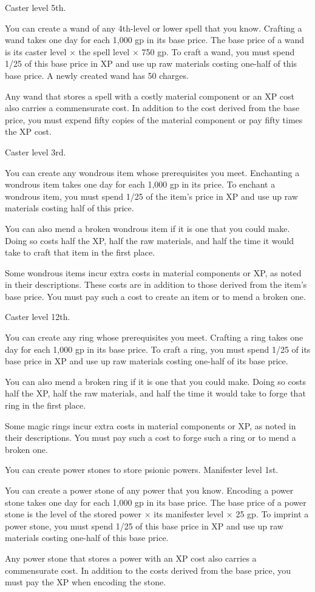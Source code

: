 {Caster level 5th.}
{You can create a wand of any 4th-level or lower spell that you know. Crafting a wand takes one day for each 1,000 gp in its base price. The base price of a wand is its caster level $\times$ the spell level $\times$ 750 gp. To craft a wand, you must spend 1/25 of this base price in XP and use up raw materials costing one-half of this base price. A newly created wand has 50 charges.

Any wand that stores a spell with a costly material component or an XP cost also carries a commensurate cost. In addition to the cost derived from the base price, you must expend fifty copies of the material component or pay fifty times the XP cost.}

{Caster level 3rd.}
{You can create any wondrous item whose prerequisites you meet. Enchanting a wondrous item takes one day for each 1,000 gp in its price. To enchant a wondrous item, you must spend 1/25 of the item's price in XP and use up raw materials costing half of this price.

You can also mend a broken wondrous item if it is one that you could make. Doing so costs half the XP, half the raw materials, and half the time it would take to craft that item in the first place.

Some wondrous items incur extra costs in material components or XP, as noted in their descriptions. These costs are in addition to those derived from the item's base price. You must pay such a cost to create an item or to mend a broken one.}

{Caster level 12th.}
{You can create any ring whose prerequisites you meet. Crafting a ring takes one day for each 1,000 gp in its base price. To craft a ring, you must spend 1/25 of its base price in XP and use up raw materials costing one-half of its base price.

You can also mend a broken ring if it is one that you could make. Doing so costs half the XP, half the raw materials, and half the time it would take to forge that ring in the first place.

Some magic rings incur extra costs in material components or XP, as noted in their descriptions. You must pay such a cost to forge such a ring or to mend a broken one.}

{You can create power stones to store psionic powers.}
{Manifester level 1st.}
{You can create a power stone of any power that you know. Encoding a power stone takes one day for each 1,000 gp in its base price. The base price of a power stone is the level of the stored power $\times$ its manifester level $\times$ 25 gp. To imprint a power stone, you must spend 1/25 of this base price in XP and use up raw materials costing one-half of this base price.

Any power stone that stores a power with an XP cost also carries a commensurate cost. In addition to the costs derived from the base price, you must pay the XP when encoding the stone.}{}{}

